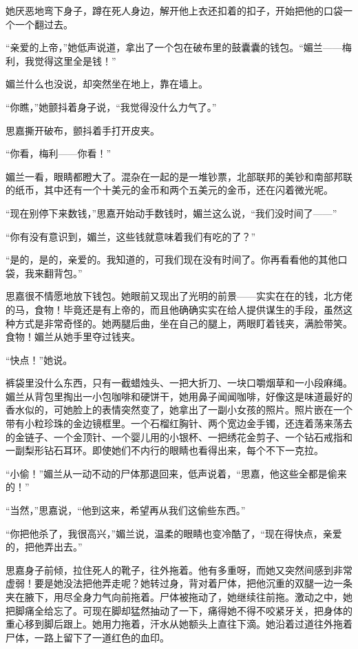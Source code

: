 \par 她厌恶地弯下身子，蹲在死人身边，解开他上衣还扣着的扣子，开始把他的口袋一个一个翻过去。
\par “亲爱的上帝，”她低声说道，拿出了一个包在破布里的鼓囊囊的钱包。“媚兰——梅利，我觉得这里全是钱！”
\par 媚兰什么也没说，却突然坐在地上，靠在墙上。
\par “你瞧，”她颤抖着身子说，“我觉得没什么力气了。”
\par 思嘉撕开破布，颤抖着手打开皮夹。
\par “你看，梅利——你看！”
\par 媚兰一看，眼睛都瞪大了。混杂在一起的是一堆钞票，北部联邦的美钞和南部邦联的纸币，其中还有一个十美元的金币和两个五美元的金币，还在闪着微光呢。
\par “现在别停下来数钱，”思嘉开始动手数钱时，媚兰这么说，“我们没时间了——”
\par “你有没有意识到，媚兰，这些钱就意味着我们有吃的了？”
\par “是的，是的，亲爱的。我知道的，可我们现在没有时间了。你再看看他的其他口袋，我来翻背包。”
\par 思嘉很不情愿地放下钱包。她眼前又现出了光明的前景——实实在在的钱，北方佬的马，食物！毕竟还是有上帝的，而且他确确实实在给人提供谋生的手段，虽然这种方式是非常奇怪的。她两腿后曲，坐在自己的腿上，两眼盯着钱夹，满脸带笑。食物！媚兰从她手里夺过钱夹。
\par “快点！”她说。
\par 裤袋里没什么东西，只有一截蜡烛头、一把大折刀、一块口嚼烟草和一小段麻绳。媚兰从背包里掏出一小包咖啡和硬饼干，她用鼻子闻闻咖啡，好像这是味道最好的香水似的，可她脸上的表情突然变了，她拿出了一副小女孩的照片。照片嵌在一个带有小粒珍珠的金边镜框里。一个石榴红胸针、两个宽边金手镯，还连着荡来荡去的金链子、一个金顶针、一个婴儿用的小银杯、一把绣花金剪子、一个钻石戒指和一副梨形钻石耳环。即使她们不内行的眼睛也看得出来，每个不下一克拉。
\par “小偷！”媚兰从一动不动的尸体那退回来，低声说着，“思嘉，他这些全都是偷来的！”
\par “当然，”思嘉说，“他到这来，希望再从我们这偷些东西。”
\par “你把他杀了，我很高兴，”媚兰说，温柔的眼睛也变冷酷了，“现在得快点，亲爱的，把他弄出去。”
\par 思嘉身子前倾，拉住死人的靴子，往外拖着。他有多重呀，而她又突然间感到非常虚弱！要是她没法把他弄走呢？她转过身，背对着尸体，把他沉重的双腿一边一条夹在腋下，用尽全身力气向前拖着。尸体被拖动了，她继续往前拖。激动之中，她把脚痛全给忘了。可现在脚却猛然抽动了一下，痛得她不得不咬紧牙关，把身体的重心移到脚后跟上。她用力拖着，汗水从她额头上直往下滴。她沿着过道往外拖着尸体，一路上留下了一道红色的血印。
